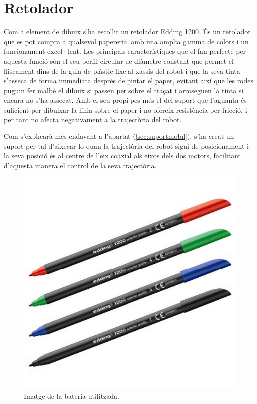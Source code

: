\section{Retolador} \label{sec:retolador}

Com a element de dibuix s’ha escollit un retolador Edding 1200. És un retolador que es pot compra a qualsevol papereria, amb una amplia gamma de colors i un funcionament excel·lent. Les principals característiques que el fan perfecte per aquesta funció són el seu perfil circular de diàmetre constant que permet el lliscament dins de la guia de plàstic fixe al xassís del robot i que la seva tinta s’asseca de forma immediata després de pintar el paper, evitant així que les rodes puguin fer malbé el dibuix si passen per sobre el traçat i arroseguen la tinta si encara no s'ha assecat. Amb el seu propi pes més el del suport que l'aguanta és suficient per dibuixar la línia sobre el paper i no ofereix resistència per fricció, i per tant no afecta negativament a la trajectòria del robot. 

Com s’explicarà més endavant a l'apartat (\ref{sec:suportmobil}), s’ha creat un suport per tal d’aixecar-lo quan la trajectòria del robot sigui de posicionament i la seva posició és al centre de l’eix coaxial als eixos dels dos motors, facilitant d’aquesta manera el control de la seva trajectòria. 

\begin{figure}[H]
	\centering
	\includegraphics[scale=0.3]{retolador.png}
	\caption{Imatge de la bateria utilitzada.}
	\label{fig:retolador}
\end{figure}